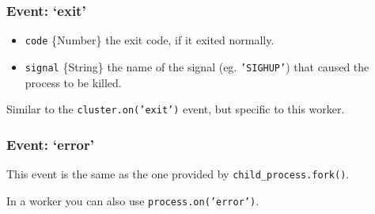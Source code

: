 \subsubsection{Event: `exit'}\label{event-exit-1}

\begin{itemize}
\itemsep1pt\parskip0pt
\item
  \texttt{code} \{Number\} the exit code, if it exited normally.
\item
  \texttt{signal} \{String\} the name of the signal (eg.
  \texttt{'SIGHUP'}) that caused the process to be killed.
\end{itemize}

Similar to the \texttt{cluster.on('exit')} event, but specific to this
worker.

\begin{Shaded}
\begin{Highlighting}[]
 \NormalTok{();}
\NormalTok{(}\NormalTok{, }
    \NormalTok{(}
  \NormalTok{\} }  \NormalTok{) \{}
    \NormalTok{(}
  \NormalTok{\} } \NormalTok{\{}
    \NormalTok{(}\NormalTok{);}
  \NormalTok{\}}
\NormalTok{\});}
\end{Highlighting}
\end{Shaded}

\subsubsection{Event: `error'}\label{event-error}

This event is the same as the one provided by
\texttt{child\_process.fork()}.

In a worker you can also use \texttt{process.on('error')}.
